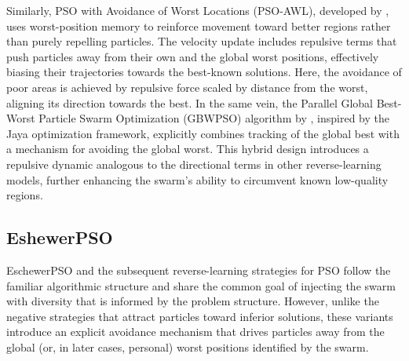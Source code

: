 {Similarly, PSO with Avoidance of Worst Locations (PSO-AWL), developed by \citet{mason2016avoidance}, uses worst-position memory to reinforce movement toward better regions rather than purely repelling particles. The velocity update includes repulsive terms that push particles away from their own and the global worst positions, effectively biasing their trajectories towards the best-known solutions. Here, the avoidance of poor areas is achieved by repulsive force scaled by distance from the worst, aligning its direction towards the best. In the same vein, the Parallel Global Best-Worst Particle Swarm Optimization (GBWPSO) algorithm by \citet{kumar2023parallel}, inspired by the Jaya optimization framework, explicitly combines tracking of the global best with a mechanism for avoiding the global worst. This hybrid design introduces a repulsive dynamic analogous to the directional terms in other reverse-learning models, further enhancing the swarm’s ability to circumvent known low-quality regions.

\subsection*{EshewerPSO}

EschewerPSO and the subsequent reverse-learning strategies for PSO follow the familiar algorithmic structure and share the common goal of injecting the swarm with diversity that is informed by the problem structure. However, unlike the negative strategies that attract particles toward inferior solutions, these variants introduce an explicit avoidance mechanism that drives particles away from the global (or, in later cases, personal) worst positions identified by the swarm.

}
